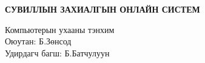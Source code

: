 \clearpage
{}
{}

\begin{center}
  {\large\bfseries\MakeUppercase{Сувиллын захиалгын онлайн систем}\par}
\end{center}

\begin{flushright}
  \small
  Компьютерын ухааны тэнхим\\
  Оюутан: Б.Зөнсод\\
  Удирдагч багш: Б.Батчулуун
\end{flushright}

\vspace{0.3cm}
\setlength{\columnsep}{0.6cm}
\setcounter{figure}{0}
\setcounter{table}{0}

